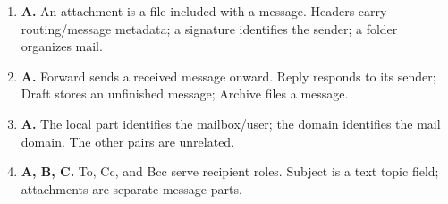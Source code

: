 \begin{enumerate}[label=\textbf{Q\arabic*.}, leftmargin=*]
\item \textbf{A.} An attachment is a file included with a message. Headers carry routing/message metadata; a signature identifies the sender; a folder organizes mail.

\item \textbf{A.} Forward sends a received message onward. Reply responds to its sender; Draft stores an unfinished message; Archive files a message.

\item \textbf{A.} The local part identifies the mailbox/user; the domain identifies the mail domain. The other pairs are unrelated.

\item \textbf{A, B, C.} To, Cc, and Bcc serve recipient roles. Subject is a text topic field; attachments are separate message parts.

\end{enumerate}
